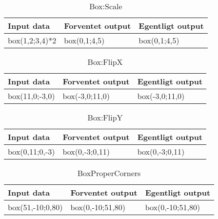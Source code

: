 \begin{table}[ht]
	\caption{Box:Scale}
	\centering
	\begin{tabular}{L L L}
		\hline\hline
		Input data & Forventet output & Egentligt output \\ [0.5ex]
		\hline
		box(1,2;3,4)*2 & box(0,1;4,5) & box(0,1;4,5)\\
		\hline
	\end{tabular}
\end{table}

\begin{table}[ht]
	\caption{Box:FlipX}
	\centering
	\begin{tabular}{L L L}
		\hline\hline
		Input data & Forventet output & Egentligt output \\ [0.5ex]
		\hline
		box(11,0;-3,0) & box(-3,0;11,0) & box(-3,0;11,0)\\
		\hline
	\end{tabular}
\end{table}

\begin{table}[ht]
	\caption{Box:FlipY}
	\centering
	\begin{tabular}{L L L}
		\hline\hline
		Input data & Forventet output & Egentligt output \\ [0.5ex]
		\hline
		box(0,11;0,-3) & box(0,-3;0,11) & box(0,-3;0,11)\\
		\hline
	\end{tabular}
\end{table}

\begin{table}[ht]
	\caption{BoxProperCorners}
	\centering
	\begin{tabular}{L L L}
		\hline\hline
		Input data & Forventet output & Egentligt output \\ [0.5ex]
		\hline
		box(51,-10;0,80) & box(0,-10;51,80) & box(0,-10;51,80)\\
		\hline
	\end{tabular}
\end{table}